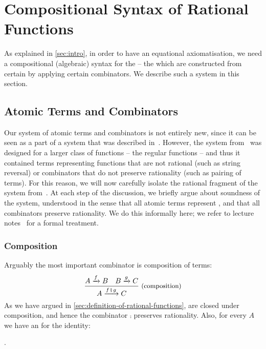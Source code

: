 \section{Compositional Syntax of Rational Functions}
\label{sec:syntax}
As explained in \cref{sec:intro}, in order to have an equational axiomatisation, we need a compositional (algebraic) syntax for the  -- the  which are constructed from certain  by applying certain combinators. We describe such a system in this section.

\subsection{Atomic Terms and Combinators}
\label{sec:atomic-terms-and-combinators}
%
Our system of  atomic terms and combinators  is not entirely new, since it can be seen as a  part of a system that was described in~\cite{BojanczykDaviaudKrishna2018}. However, the system from~\cite{BojanczykDaviaudKrishna2018} was designed for a larger class of functions -- the regular functions -- and thus it contained terms representing functions that are not rational (such as string reversal) or combinators that do not preserve rationality (such as pairing of terms). For this reason, we will now carefully isolate the rational fragment of the system from~\cite{BojanczykDaviaudKrishna2018}. At each step of the discussion, we briefly argue about soundness of the system, understood in the sense that all atomic terms represent , and that all combinators preserve rationality. We do this informally here; we refer to lecture notes~\cite[Section C.5.2]{Bojanczyk2026} for a formal treatment.

\subsubsection{Composition}
Arguably the most important combinator is  composition of terms: 
\begin{align*}
    \combinator{
        A \xrightarrow  f B \quad B \xrightarrow g C
    } {
        A \xrightarrow {f \comp g} C
    }{\ (composition)}
\end{align*}
As we have argued in \cref{sec:definition-of-rational-functions},  are closed under composition, and hence the combinator $\comp$ preserves rationality. Also, for every  $A$ we have an  for the identity:
\begin{atomicterm}
    \label{atomic:identity}
.
\end{atomicterm}
